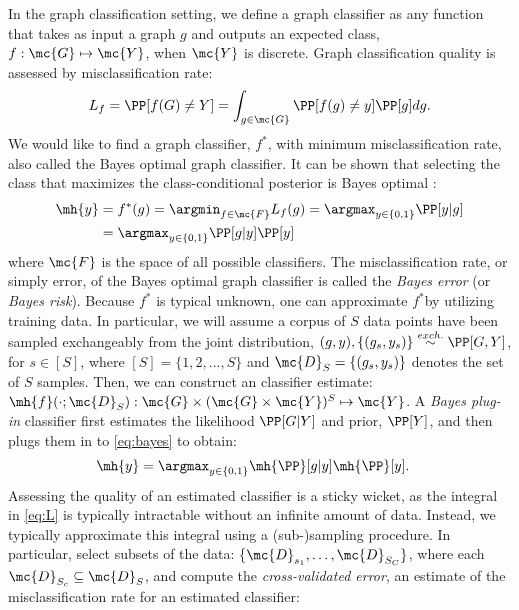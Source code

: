 In the graph classification setting, we define a graph classifier as any function that takes as input a graph $g$ and outputs an expected class, $f: \mc{G} \mapsto \mc{Y}$, when $\mc{Y}$ is discrete.  Graph classification quality is assessed by misclassification rate:
\begin{align} \label{eq:L}
	L_f = \PP[f(G) \neq Y] = \int_{g \in \mc{G}} \PP[f(g) \neq y]  \PP[g] dg.
\end{align}
We would like to find a graph classifier, $f^*$, with minimum misclassification rate, also called the Bayes optimal graph classifier. 
It can be shown that selecting the class that maximizes the class-conditional posterior is Bayes optimal \cite{DGL96}:
\begin{align} \label{eq:bayes}
	\mh{y} &= f^*(g) =\argmin_{f \in \mc{F}} L_f(g) = \argmax_{y \in \{0,1\}} \PP[y | g] \nonumber
	\\ &= \argmax_{y \in \{0,1\}} \PP[g | y] \PP[y]  
\end{align}
where $\mc{F}$ is the space of all possible classifiers. The misclassification rate, or simply error, of the Bayes optimal graph classifier is called the \emph{Bayes error} (or \emph{Bayes risk}).  Because $f^*$ is typical unknown, one can approximate $f^*$by utilizing training data. In particular, we will assume a corpus of $S$ data points have been sampled exchangeably from the joint distribution, $(g,y), \{(g_s,y_s)\} \overset{exch.}{\sim} \PP[G,Y]$, for $s \in [S]$, where $[S]=\{1,2,\ldots, S\}$ and
  $\mc{D}_S =\{(g_s,y_s)\}$ denotes the set of $S$ samples.  Then, we can construct an classifier estimate: $\mh{f}(\cdot; \mc{D}_S): \mc{G} \times (\mc{G} \times \mc{Y})^S \mapsto \mc{Y}$.  
A \emph{Bayes plug-in} classifier first estimates the likelihood $\PP[G|Y]$ and prior, $\PP[Y]$, and then plugs them in to \eqref{eq:bayes} to obtain:
\begin{align} \label{eq:plugin}
	\mh{y} &= \argmax_{y \in \{0,1\}} \mh{\PP}[g | y] \mh{\PP}[y].  
\end{align}
Assessing the quality of an estimated classifier is a sticky wicket, as the integral in \eqref{eq:L} is typically intractable without an infinite amount of data.  Instead, we typically approximate this integral using a (sub-)sampling procedure.  In particular, select subsets of the data: \{$\mc{D}_{s_1},\ldots, \mc{D}_{S_C}\}$, where each $\mc{D}_{S_c} \subseteq \mc{D}_S$, and compute the \emph{cross-validated error}, an estimate of the misclassification rate for an estimated classifier:
